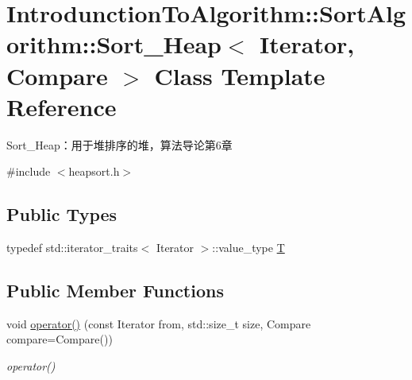 \hypertarget{class_introdunction_to_algorithm_1_1_sort_algorithm_1_1_sort___heap}{}\section{Introdunction\+To\+Algorithm\+:\+:Sort\+Algorithm\+:\+:Sort\+\_\+\+Heap$<$ Iterator, Compare $>$ Class Template Reference}
\label{class_introdunction_to_algorithm_1_1_sort_algorithm_1_1_sort___heap}


Sort\+\_\+\+Heap：用于堆排序的堆，算法导论第6章  




{\ttfamily \#include $<$heapsort.\+h$>$}

\subsection*{Public Types}
\begin{DoxyCompactItemize}
\item 
typedef std\+::iterator\+\_\+traits$<$ Iterator $>$\+::value\+\_\+type \hyperlink{class_introdunction_to_algorithm_1_1_sort_algorithm_1_1_sort___heap_a919579152d685b356d4776fc8d2eeb90}{T}
\end{DoxyCompactItemize}
\subsection*{Public Member Functions}
\begin{DoxyCompactItemize}
\item 
void \hyperlink{class_introdunction_to_algorithm_1_1_sort_algorithm_1_1_sort___heap_a3c6f55939475aac8e7651248230e1730}{operator()} (const Iterator from, std\+::size\+\_\+t size, Compare compare=Compare())
\begin{DoxyCompactList}\small\item\em operator() \end{DoxyCompactList}\end{DoxyCompactItemize}
